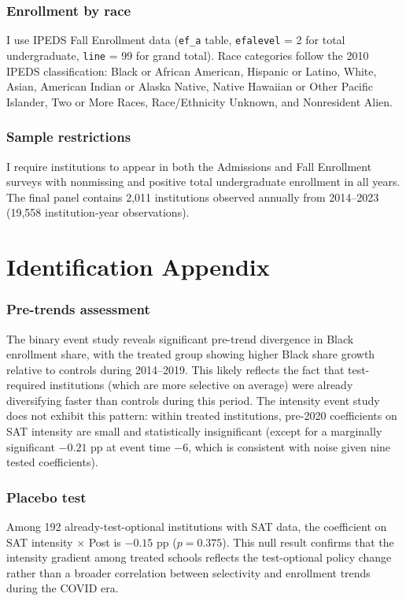 \documentclass[12pt]{article}
\begin{document}
\subsubsection*{Enrollment by race} I use IPEDS Fall Enrollment data (\texttt{ef\_a} table, \texttt{efalevel} = 2 for total undergraduate, \texttt{line} = 99 for grand total). Race categories follow the 2010 IPEDS classification: Black or African American, Hispanic or Latino, White, Asian, American Indian or Alaska Native, Native Hawaiian or Other Pacific Islander, Two or More Races, Race/Ethnicity Unknown, and Nonresident Alien.

\subsubsection*{Sample restrictions} I require institutions to appear in both the Admissions and Fall Enrollment surveys with nonmissing and positive total undergraduate enrollment in all years. The final panel contains 2,011 institutions observed annually from 2014--2023 (19,558 institution-year observations).

\section{Identification Appendix}
\label{app:id}

\subsubsection*{Pre-trends assessment} The binary event study reveals significant pre-trend divergence in Black enrollment share, with the treated group showing higher Black share growth relative to controls during 2014--2019. This likely reflects the fact that test-required institutions (which are more selective on average) were already diversifying faster than controls during this period. The intensity event study does not exhibit this pattern: within treated institutions, pre-2020 coefficients on SAT intensity are small and statistically insignificant (except for a marginally significant $-0.21$ pp at event time $-6$, which is consistent with noise given nine tested coefficients).

\subsubsection*{Placebo test} Among 192 already-test-optional institutions with SAT data, the coefficient on SAT intensity $\times$ Post is $-0.15$ pp ($p = 0.375$). This null result confirms that the intensity gradient among treated schools reflects the test-optional policy change rather than a broader correlation between selectivity and enrollment trends during the COVID era.
\end{document}
